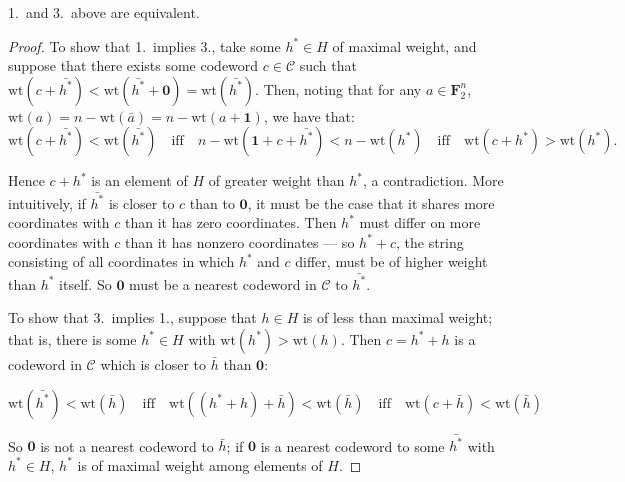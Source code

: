 \documentclass[10pt,a4paper]{amsart}
\newcommand{\FF}{\mathbf{F}}
\newcommand{\calC}{\mathcal{C}}
\newcommand{\wt}{\text{wt}}
\begin{document}
\begin{lemma}\label{lem:13eq}
    1.\ and 3.\ above are equivalent.
\end{lemma}

\begin{proof}
    To show that 1.\ implies 3., take some $h^* \in H$ of maximal weight, and suppose that there exists some codeword $c \in \calC$ such that $\wt(c + \bar{h^*}) < \wt(\bar{h^*} + \mathbf{0}) = \wt(\bar{h^*})$. Then, noting that for any $a \in \FF_2^n$, $\wt(a) = n - \wt(\bar{a}) = n - \wt(a + \mathbf{1})$, we have that: 
    \[
        \wt(c + \bar{h^*}) < \wt(\bar{h^*})
        \quad\text{iff}\quad
        n - \wt(\mathbf{1} + c + \bar{h^*}) < n - \wt(h^*)
        \quad\text{iff}\quad
        \wt(c + h^*)> \wt(h^*).
    \]
    
    Hence $c + h^*$ is an element of $H$ of greater weight than $h^*$, a contradiction. More intuitively, if $\bar{h^*}$ is closer to $c$ than to $\mathbf{0}$, it must be the case that it shares more coordinates with $c$ than it has zero coordinates. Then $h^*$ must differ on more coordinates with $c$ than it has nonzero coordinates --- so $h^* + c$, the string consisting of all coordinates in which $h^*$ and $c$ differ, must be of higher weight than $h^*$ itself. So $\mathbf{0}$ must be a nearest codeword in $\calC$ to $\bar{h^*}$.

    To show that 3.\ implies 1., suppose that $h \in H$ is of less than maximal weight; that is, there is some $h^* \in H$ with $\wt(h^*) > \wt(h)$. Then $c = h^* + h$ is a codeword in $\calC$ which is closer to $\bar{h}$ than $\mathbf{0}$:

    \[
        \wt(\bar{h^*}) < \wt(\bar{h})
        \quad\text{iff}\quad
        \wt((h^* + h) + \bar{h}) < \wt(\bar{h})
        \quad\text{iff}\quad
        \wt(c + \bar{h})< \wt(\bar{h})
    \]

    So $\mathbf{0}$ is not a nearest codeword to $\bar{h}$; if $\mathbf{0}$ is a nearest codeword to some $\bar{h^*}$ with $h^* \in H$, $h^*$ is of maximal weight among elements of $H$.
\end{proof}
\end{document}
